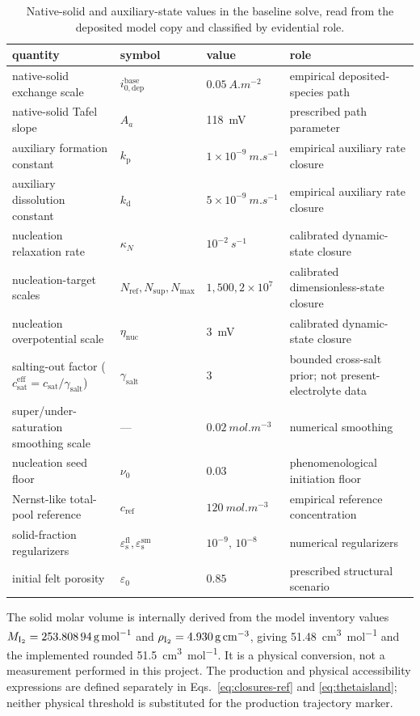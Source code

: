 \documentclass[11pt]{article}
\newcommand{\epss}{\varepsilon_{\mathrm{s}}}
\newcommand{\csat}{c_{\mathrm{sat}}}
\begin{document}
\begin{table}[h]\centering\small
\caption{Native-solid and auxiliary-state values in the baseline solve, read from the deposited model copy and
classified by evidential role.}\label{tab:solidsource}
\begin{tabular}{@{}p{}p{}p{}p{}@{}}
\toprule
quantity & symbol & value & role\\
\midrule
native-solid exchange scale & $i_{0,\mathrm{dep}}^{\mathrm{base}}$ & $0.05~\si{A.m^{-2}}$ & empirical deposited-species path\\
native-solid Tafel slope & $A_a$ & \SI{118}{mV} & prescribed path parameter\\
auxiliary formation constant & $k_{\mathrm p}$ & $1\times10^{-9}~\si{m.s^{-1}}$ & empirical auxiliary rate closure\\
auxiliary dissolution constant & $k_{\mathrm d}$ & $5\times10^{-9}~\si{m.s^{-1}}$ & empirical auxiliary rate closure\\
nucleation relaxation rate & $\kappa_N$ & $10^{-2}~\si{s^{-1}}$ & calibrated dynamic-state closure\\
nucleation-target scales & $N_{\mathrm{ref}},N_{\mathrm{sup}},N_{\max}$ & $1,500,2\times10^7$ & calibrated dimensionless-state closure\\
nucleation overpotential scale & $\eta_{\mathrm{nuc}}$ & \SI{3}{mV} & calibrated dynamic-state closure\\
salting-out factor ($\csat^{\mathrm{eff}}=\csat/\gamma_{\mathrm{salt}}$) & $\gamma_{\mathrm{salt}}$ & $3$ & bounded cross-salt prior; not present-electrolyte data\\
super/under-saturation smoothing scale & --- & $0.02~\si{mol.m^{-3}}$ & numerical smoothing\\
nucleation seed floor & $\nu_0$ & $0.03$ & phenomenological initiation floor\\
Nernst-like total-pool reference & $c_{\mathrm{ref}}$ & $120~\si{mol.m^{-3}}$ & empirical reference concentration\\
solid-fraction regularizers & $\epss^{\mathrm{fl}},\epss^{\mathrm{sm}}$ & $10^{-9},\,10^{-8}$ & numerical regularizers\\
initial felt porosity & $\varepsilon_0$ & $0.85$ & prescribed structural scenario\\
\bottomrule
\end{tabular}
\end{table}
The solid molar volume is internally derived from the model inventory values
$M_{\ce{I2}}=\SI{253.80894}{g.mol^{-1}}$ and
$\rho_{\ce{I2}}=\SI{4.930}{g.cm^{-3}}$, giving \SI{51.48}{cm^3.mol^{-1}} and the implemented rounded
\SI{51.5}{cm^3.mol^{-1}}. It is a physical conversion, not a measurement performed in this project.
The production and physical accessibility expressions are defined separately in
Eqs.~\eqref{eq:closures-ref} and \eqref{eq:thetaisland}; neither physical threshold is substituted for the
production trajectory marker.
\end{document}
